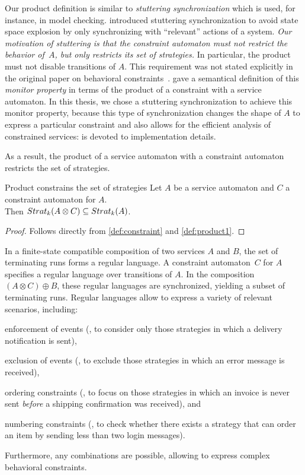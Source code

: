 Our product definition is similar to \emph{stuttering synchronization} which is used, for instance, in  model checking. \citet{EsparzaH_2008_unfoldings} introduced stuttering synchronization to avoid state space explosion by only synchronizing with ``relevant'' actions of a system. \emph{Our motivation of stuttering is that the constraint automaton must not restrict the behavior of~$A$, but only restricts its set of strategies.} In particular, the product must not disable transitions of $A$. This requirement was not stated explicitly in the original paper on behavioral constraints~\cite{LohmannMW_2007_bpm}. \citet{Wolf_2008_topnoc} gave a semantical definition of this \emph{monitor property} in terms of the product of a constraint with a service automaton. In this thesis, we chose a stuttering synchronization to achieve this monitor property, because this type of synchronization changes the shape of $A$ to express a particular constraint and also allows for the efficient analysis of constrained services:  is devoted to implementation details.

As a result, the product of a service automaton with a constraint automaton restricts the set of strategies.

\begin{lemma}{Product constrains the set of strategies}
Let $A$ be a service automaton and $C$ a constraint automaton for $A$.\\ Then $\mathop{Strat}_{k}(A\otimes C)\subseteq\mathop{Strat}_{k}(A)$.
\end{lemma}

\begin{proof}
Follows directly from \autoref{def:constraint} and \autoref{def:product1}.
\end{proof}

In a finite-state compatible composition of two services $A$ and $B$, the set of terminating runs forms a regular language. A constraint automaton~$C$ for $A$ specifies a regular language over transitions of $A$. In the composition $(A\otimes C)\oplus B$, these regular languages are synchronized, yielding a subset of terminating runs. Regular languages allow to express a variety of relevant scenarios, including:
\begin{niceitemize}
\item enforcement of events (\eg, to consider only those strategies in which a delivery notification is sent),
\item exclusion of events (\eg, to exclude those strategies in which an error message is received),
\item ordering constraints (\eg, to focus on those strategies in which an invoice is never sent \emph{before} a shipping confirmation was received), and
\item numbering constraints (\eg, to check whether there exists a strategy that can order an item by sending less than two login messages).
\end{niceitemize}
Furthermore, any combinations are possible, allowing to express complex behavioral constraints.

